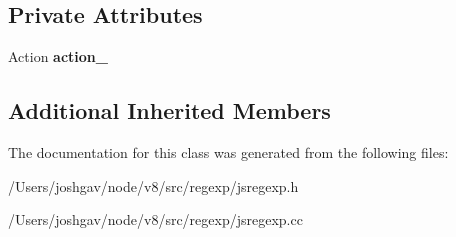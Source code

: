 \subsection*{Private Attributes}
\begin{DoxyCompactItemize}
\item 
Action {\bfseries action\+\_\+}\hypertarget{classv8_1_1internal_1_1_end_node_a9e78a49bcd67365d5cbb49d52a63e071}{}\label{classv8_1_1internal_1_1_end_node_a9e78a49bcd67365d5cbb49d52a63e071}

\end{DoxyCompactItemize}
\subsection*{Additional Inherited Members}


The documentation for this class was generated from the following files\+:\begin{DoxyCompactItemize}
\item 
/\+Users/joshgav/node/v8/src/regexp/jsregexp.\+h\item 
/\+Users/joshgav/node/v8/src/regexp/jsregexp.\+cc\end{DoxyCompactItemize}
